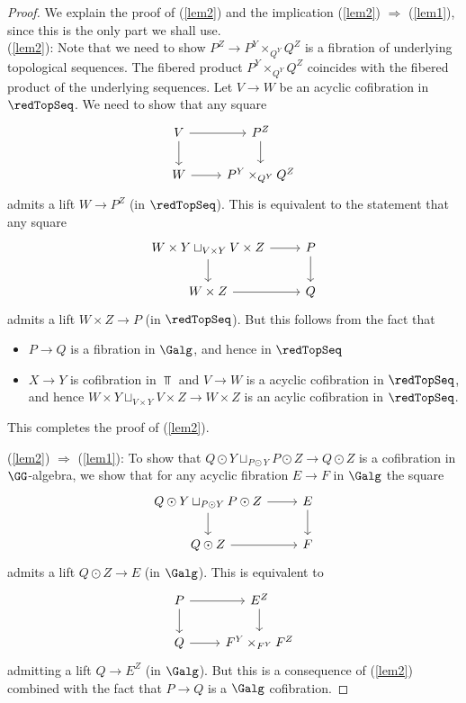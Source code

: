 \documentclass[a4paper,10pt]{amsart}
\begin{document}
	\begin{proof}
	We explain the proof of (\ref{lem2}) and the implication (\ref{lem2}) $\Rightarrow$ (\ref{lem1}), since this is the only part we shall use.\\
	(\ref{lem2}): Note that we need to show $P^Z \to P^Y \times_{Q^Y} Q^Z$ is a fibration of underlying topological sequences. The fibered product $P^Y \times_{Q^Y} Q^Z$ coincides with the fibered product of the underlying sequences. Let $V \to W$ be an acyclic cofibration in $\redTopSeq$. We need to show that any square
\[	\begin{tikzcd}
		V \ar{r}\ar{d} & P^Z \ar{d}\\
		W \ar{r}& P^Y \times_{Q^Y} Q^Z
	\end{tikzcd}
\]
	admits a lift $W \to P^Z$ (in $\redTopSeq$). This is equivalent to the statement that any square
\[
	\begin{tikzcd}
		W \times Y \sqcup_{V \times Y} V \times Z \ar{r}\ar{d} &P \ar{d} \\
		W \times Z \ar{r} &Q
	\end{tikzcd}
\]
	admits a lift $W \times Z \to P$ (in $\redTopSeq$). But this follows from the fact that
	\begin{itemize}
		\item $P \to Q$ is a fibration in $\Galg$, and hence in $\redTopSeq$
		\item $X \to Y$ is cofibration in $\Top$ and $V \to W$ is a acyclic cofibration in $\redTopSeq$, and hence $W \times Y \sqcup_{V \times Y} V \times Z \to W \times Z$ is an acylic cofibration in $\redTopSeq$.
	\end{itemize}
		This completes the proof of (\ref{lem2}).
		
	(\ref{lem2}) $\Rightarrow$ (\ref{lem1}): To show that $Q \odot Y \sqcup_{P \odot Y} P \odot Z \to Q \odot Z$ is a cofibration in $\GG$-algebra, we show that for any acyclic fibration $E \to F$ in $\Galg$ the square
\[
	\begin{tikzcd}
			Q \odot Y \sqcup_{P \odot Y}  P \odot Z \ar{r}\ar{d} & E \ar{d}\\
			Q \odot Z \ar{r} & F
	\end{tikzcd}
\]
admits a lift $Q \odot Z \to E$ (in $\Galg$). This is equivalent to 
\[
	\begin{tikzcd}
	P \ar{r}\ar{d} & E^Z \ar{d}\\
	Q \ar{r} &F^Y \times_{F^Y} F^Z
	\end{tikzcd}
\]
admitting a lift $Q \to E^Z$ (in $\Galg$). But this is a consequence of (\ref{lem2}) combined with the fact that $P \to Q$ is a $\Galg$ cofibration.
	\end{proof}
	
\end{document}
